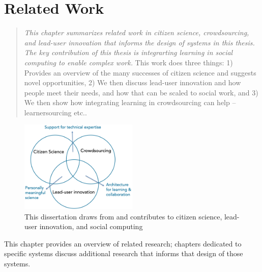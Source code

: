 
\chapter{Related Work}

\begin{quote}
\emph{This chapter summarizes related work in citizen science, crowdsourcing, and  lead-user innovation that informs the design of systems in this thesis. The key contribution of this thesis is integrarting learning in social computing to enable complex work. }This work does three things: 1) Provides an overview of the many successes of citizen science and suggests novel opportunities,  2) We then discuss lead-user innovation and how people meet their needs, and how that can be scaled to social work, and 3) We then show how integrating learning in crowdsourcing can help -- learnersourcing etc.. 
\end{quote}

\begin{figure}
  \centering
  \includegraphics[width=0.5\textwidth]{figures/2-related/venn.png}
  \caption[]
{This dissertation draws from and contributes to citizen science, lead-user innovation, and social computing}
  \label{fig:related-1}
\end{figure}



\vspace{0.25in}

This chapter provides an overview of related research; chapters dedicated to specific systems discuss additional research that informs that design of those systems.


